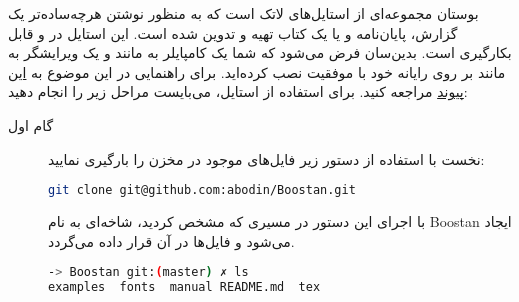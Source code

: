 \documentclass{report}
\begin{document}
بوستان مجموعه‌ای از استایل‌های لاتک است که به منظور نوشتن هرچه‌ساده‌تر یک گزارش، پایان‌نامه و یا یک کتاب تهیه و تدوین شده است. این استایل در
 و 
قابل بکارگیری است. بدین‌سان فرض می‌شود که شما یک کامپایلر 
\lr{\TeX} به مانند 
و یک ویرایشگر به مانند
بر روی رایانه خود با موفقیت نصب کرده‌اید. برای راهنمایی در این موضوع به 
\href{http://www.parsilatex.com/wiki/%D8%A8%D8%B1%D8%A7%DB%8C_%DA%A9%D8%A7%D8%B1_%D8%A8%D8%A7_%D9%84%D8%A7%D8%AA%DA%A9_%DA%86%D9%87_%DA%86%DB%8C%D8%B2%D9%87%D8%A7%DB%8C%DB%8C_%D9%86%DB%8C%D8%A7%D8%B2_%D8%AF%D8%A7%D8%B1%DB%8C%D9%85%D8%9F}{این پیوند}
مراجعه کنید. برای استفاده از استایل، می‌بایست مراحل زیر را انجام دهید:
\begin{description}
\item[گام اول]


نخست با استفاده از دستور زیر فایل‌های موجود در مخزن را بارگیری نمایید:
\begin{lstlisting}[language=bash]
git clone git@github.com:abodin/Boostan.git
\end{lstlisting}

 با اجرای این دستور در مسیری که مشخص کردید، شاخه‌ای به نام Boostan ایجاد می‌شود و فایل‌ها در آن قرار داده می‌گردد.
\begin{lstlisting}[language=bash]
-> Boostan git:(master) ✗ ls 
examples  fonts  manual README.md  tex
\end{lstlisting}


\end{description}
\end{document}
